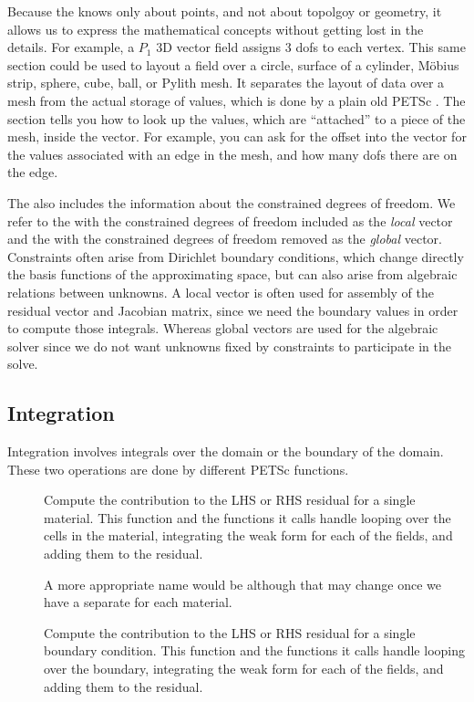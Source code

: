Because the  knows only about points, and not about topolgoy or geometry, it allows us to express
the mathematical concepts without getting lost in the details. For example, a $P_1$ 3D vector field assigns 3 dofs to
each vertex. This same section could be used to layout a field over a circle, surface of a cylinder, M\"obius strip,
sphere, cube, ball, or Pylith mesh. It separates the layout of data over a mesh from the actual storage of values, which
is done by a plain old PETSc . The section tells you how to look up the values, which are ``attached'' to a
piece of the mesh, inside the vector. For example, you can ask for the offset into the vector for the values associated
with an edge in the mesh, and how many dofs there are on the edge.

The  also includes the information about the
constrained degrees of freedom. We refer to the  with
the constrained degrees of freedom included as the {\em local} vector
and the  with the constrained degrees of freedom
removed as the {\em global} vector. Constraints often arise from Dirichlet boundary conditions, which change directly
the basis functions of the approximating space, but can also arise from algebraic relations between unknowns. A local
vector is often used for assembly of the residual vector and Jacobian matrix, since we need the boundary values in order
to compute those integrals. Whereas global vectors are used for the algebraic solver since we do not want unknowns fixed
by constraints to participate in the solve.


\subsection{Integration}

Integration involves integrals over the domain or the boundary of the
domain. These two operations are done by different PETSc functions.

\begin{description}
\item[] Compute the
  contribution to the LHS or RHS residual for a single material. This
  function and the functions it calls handle looping over the cells in
  the material, integrating the weak form for each of the fields, and
  adding them to the residual.

  A more appropriate name would be
   although that may change once
  we have a separate  for each material.
%
\item[] Compute the contribution
  to the LHS or RHS residual for a single boundary condition. This
  function and the functions it calls handle looping over the
  boundary, integrating the weak form for each of the fields, and
  adding them to the residual.
\end{description}

